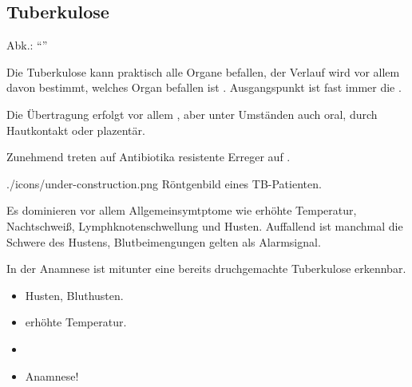 



\subsection{Tuberkulose}
\label{topic:tuberkulose}

\emph{}
Abk.: "`"'

{
Die Tuberkulose kann praktisch alle Organe befallen, der
Verlauf wird vor allem davon bestimmt, welches
Organ befallen ist . Ausgangspunkt ist fast immer die .

Die Übertragung erfolgt vor allem , aber unter
Umständen auch oral, durch Hautkontakt oder plazentär. 

Zunehmend treten auf Antibiotika resistente Erreger auf 
.

    
}{}
{./icons/under-construction.png}
{Röntgenbild eines TB-Pat\-ient\-en.}{}


{%
Es dominieren vor allem Allgemeinsymtptome wie erhöhte
Temperatur, Nachtschweiß, Lymphknotenschwellung und Husten.
Auffallend ist manchmal die Schwere des Hustens, Blutbeimengungen gelten
als Alarmsignal. 

In der Anamnese ist mitunter eine bereits druchgemachte
Tuberkulose erkennbar.
}{
\begin{itemize}
  \item Husten, Bluthusten.
  \item erhöhte Temperatur.
  \item {}
  \item Anamnese!
\end{itemize}
}
{}
{}
{}


